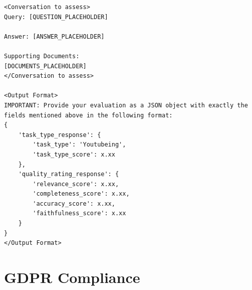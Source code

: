 \documentclass[
	english,
	ruledheaders=section,%
	class=report,%
	thesis={type=bachelor},%
	accentcolor=1b,%
	custommargins=true,%
	marginpar=false,%
	parskip=half-,%
	fontsize=11pt,%
	DIV=14,
]{tudapub}
\begin{document}
\begin{lstlisting}[caption={Prompt Template for AI based quality and task type Evaluation}, label={lst:prompt_template}]
<Conversation to assess>
Query: [QUESTION_PLACEHOLDER]

Answer: [ANSWER_PLACEHOLDER]

Supporting Documents:
[DOCUMENTS_PLACEHOLDER]
</Conversation to assess>

<Output Format>
IMPORTANT: Provide your evaluation as a JSON object with exactly the fields mentioned above in the following format:
{
    'task_type_response': {
        'task_type': 'Youtubeing',
        'task_type_score': x.xx
    },
    'quality_rating_response': {
        'relevance_score': x.xx,
        'completeness_score': x.xx,
        'accuracy_score': x.xx,
        'faithfulness_score': x.xx
    }
}
</Output Format>
\end{lstlisting}

\section*{GDPR Compliance}
\end{document}
